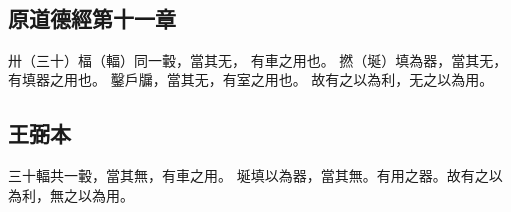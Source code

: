﻿%
%

\chapter{~}

\section{原道德經第十一章}

\begin{withgezhu}

\zhsong


卅（\textcolor{tongjia-color}{三十}）\colorbox{adding-color}{楅（\textcolor{tongjia-color}{輻}）同一轂，當}其无，
\colorbox{adding-color}{有車}之用\colorbox{adding-color}{也}。
撚（\textcolor{tongjia-color}{埏}）填為器，當其无，有填器\colorbox{adding-color}{之用也}。
\colorbox{adding-color}{鑿戶牖}，當其无，有\colorbox{adding-color}{室之}用也。
故有之以為利，无之以為用。

\end{withgezhu}

\section{王弼本}

\begin{withgezhu}

\zhsong

三十輻共一轂，當其無，有車之用。
埏填以為器，當其無。有用之器。故有之以為利，無之以為用。

\end{withgezhu}
